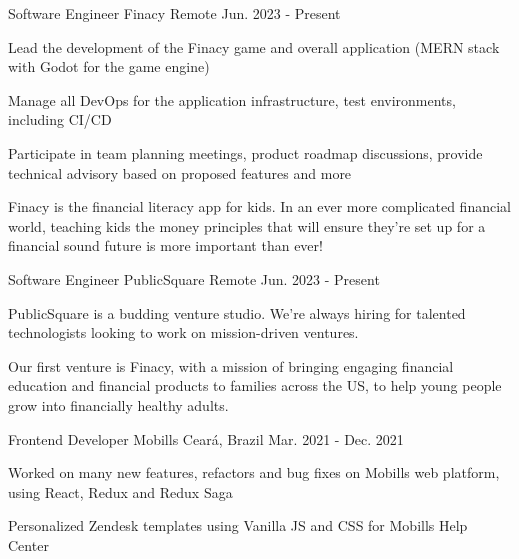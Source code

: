 

\begin{cventries}

\cventry
{Software Engineer} %
{Finacy} %
{Remote} %
{Jun. 2023 - Present} %
{
  \begin{cvitems} %
    \item {Lead the development of the Finacy game and overall application (MERN stack with Godot for the game engine)}
    \item {Manage all DevOps for the application infrastructure, test environments, including CI/CD}
    \item {Participate in team planning meetings, product roadmap discussions, provide technical advisory based on proposed features and more}
    \item {Finacy is the financial literacy app for kids. In an ever more complicated financial world, teaching kids the money principles that will ensure they're set up for a financial sound future is more important than ever!}
  \end{cvitems}
}

\cventry
{Software Engineer} %
{PublicSquare} %
{Remote} %
{Jun. 2023 - Present} %
{
  \begin{cvitems} %
    \item {PublicSquare is a budding venture studio. We're always hiring for talented technologists looking to work on mission-driven ventures.}
    \item {Our first venture is Finacy, with a mission of bringing engaging financial education and financial products to families across the US, to help young people grow into financially healthy adults.}
  \end{cvitems}
}




\cventry
{Frontend Developer} %
{Mobills} %
{Ceará, Brazil} %
{Mar. 2021 - Dec. 2021} %
{
  \begin{cvitems} %
    \item {Worked on many new features,
    refactors and bug fixes on Mobills
    web platform, using React, Redux
    and Redux Saga}
    \item {Personalized Zendesk templates
    using Vanilla JS and CSS for
    Mobills Help Center}
  \end{cvitems}
}


\end{cventries}
